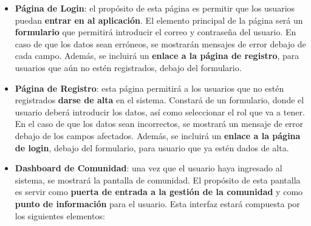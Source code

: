 \begin{appendices}
\begin{itemize}
\begin{itemize}
		Una sección que deberá ser \textbf{obligatoria}, es la sección ``\textbf{Contacta con nosotros}'', compuesta por un formulario y que permitirá a cualquier usuario, registrado o no, contactar con el equipo de desarrollo.
		
		\item \textbf{Pie de Página}: en el pie de página se añadirá una lista de enlaces con las diferentes secciones de la página, un mapa del sitio web y enlaces a las diferentes redes sociales de la aplicación. Además se deben incluir enlaces a los documentos ó páginas con las políticas de privacidad, cookies, etc. También deberá incluir \textbf{información de copyright} sobre la página.
		
	\end{itemize}
	
	Cabe destacar que tanto el \textbf{pie de página} como la \textbf{barra de menú} son elementos comunes a todas la páginas. Dependiendo de la página en la que estemos, estos adaptarán su contenido.
	
	\item \textbf{Página de Login}: el propósito de esta página es permitir que los usuarios puedan \textbf{entrar en al aplicación}. El elemento principal de la página será un \textbf{formulario} que permitirá introducir el correo y contraseña del usuario. En caso de que los datos sean erróneos, se mostrarán mensajes de error debajo de cada campo. Además, se incluirá un \textbf{enlace a la página de registro}, para usuarios que aún no estén registrados, debajo del formulario.
	
	\item \textbf{Página de Registro}: esta página permitirá a los usuarios que no estén registrados \textbf{darse de alta} en el sistema. Constará de un formulario, donde el usuario deberá introducir los datos, así como seleccionar el rol que va a tener. En el caso de que los datos sean incorrectos, se mostrará un mensaje de error debajo de los campos afectados. Además, se incluirá un \textbf{enlace a la página de login}, debajo del formulario, para usuario que ya estén dados de alta.
	
	\item \textbf{Dashboard de Comunidad}: una vez que el usuario haya ingresado al sistema, se mostrará la pantalla de comunidad. El propósito de esta pantalla es servir como \textbf{puerta de entrada a la gestión de la comunidad} y como \textbf{punto de información} para el usuario. Esta interfaz estará compuesta por los siguientes elementos:
	

\end{itemize}
\end{appendices}
